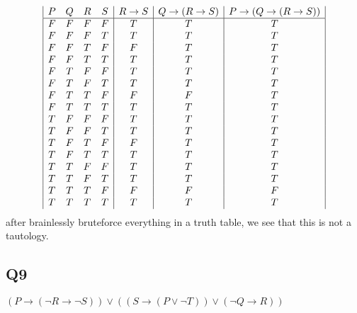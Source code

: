 \documentclass[a4paper,12pt]{article}
\begin{document}
\begin{displaymath}
\begin {array} {|c c c c|c|c|c|c|c}
P & Q & R & S & 
R \rightarrow S &
Q \rightarrow(R \rightarrow S) &
P \rightarrow (Q \rightarrow(R \rightarrow S))\\
\hline

F & F & F & F & T & T & T\\
F & F & F & T & T & T & T\\
F & F & T & F & F & T & T\\
F & F & T & T & T & T & T\\
F & T & F & F & T & T & T\\
F & T & F & T & T & T & T\\
F & T & T & F & F & F & T\\
F & T & T & T & T & T & T\\
T & F & F & F & T & T & T\\
T & F & F & T & T & T & T\\
T & F & T & F & F & T & T\\
T & F & T & T & T & T & T\\
T & T & F & F & T & T & T\\
T & T & F & T & T & T & T\\
T & T & T & F & F & F & F\\
T & T & T & T & T & T & T\\

\end{array}
\end{displaymath}
after brainlessly bruteforce everything in a truth table, we see that this is not a tautology.\\
\subsection{Q9}
$(P \rightarrow (\lnot R \rightarrow \lnot S)) \vee ((S \rightarrow (P \vee \lnot T)) \vee (\lnot Q \rightarrow R))$\\
\end{document}
